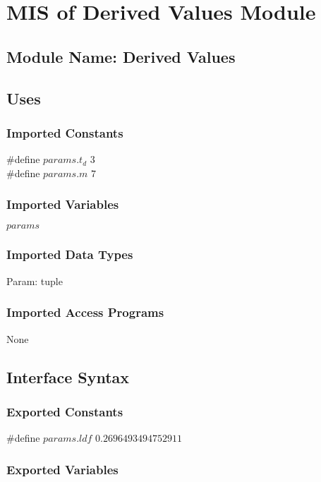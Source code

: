 \documentclass[12pt]{article}
\begin{document}
\section{MIS of Derived Values Module} \label{SecDeV}

\subsection{Module Name: Derived Values}

\subsection{Uses}

\subsubsection{Imported Constants}

\#define $params.t_{d}$ $3$ \\
\#define $params.m$ $7$

\subsubsection{Imported Variables}

$params$

\subsubsection{Imported Data Types}

Param: tuple

\subsubsection{Imported Access Programs}

None

\subsection{Interface Syntax}

\subsubsection{Exported Constants}

\#define $params.ldf$ $0.2696493494752911$

\subsubsection{Exported Variables}
\end{document}
